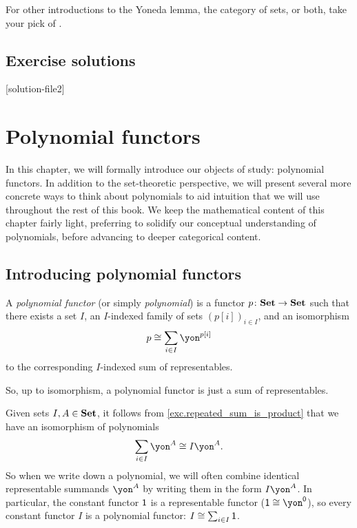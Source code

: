 \documentclass[Book-Poly]{subfiles}
\begin{document}
For other introductions to the Yoneda lemma, the category of sets, or both, take your pick of \cite{Pierce:1991,Borceux:1994a,MacLane:1998a,Leinster:2014a,Riehl:2017a,fong2019seven,cheng_2022}.

\section{Exercise solutions}
{\footnotesize
    }

[solution-file2]










\chapter{Polynomial functors} \label{ch.poly.obj}

In this chapter, we will formally introduce our objects of study: polynomial functors.
In addition to the set-theoretic perspective, we will present several more concrete ways to think about polynomials to aid intuition that we will use throughout the rest of this book.
We keep the mathematical content of this chapter fairly light, preferring to solidify our conceptual understanding of polynomials, before advancing to deeper categorical content.

\section{Introducing polynomial functors} \label{sec.poly.obj.intro}

\begin{definition}
    A \emph{polynomial functor} (or simply \emph{polynomial}) is a functor $p\colon\mathbf{Set}\to\mathbf{Set}$ such that there exists a set $I$, an $I$-indexed family of sets $(p[i])_{i\in I}$, and an isomorphism
    \[
    p\iso\sum_{i\in I}\yon^{p[i]}
    \]
    to the corresponding $I$-indexed sum of representables.
\end{definition}

So, up to isomorphism, a polynomial functor is just a sum of representables.


\begin{remark}
    Given sets $I, A \in \mathbf{Set}$, it follows from \cref{exc.repeated_sum_is_product} that we have an isomorphism of polynomials
    \[
    \sum_{i \in I} \yon^A \iso I\yon^A.
    \]
    So when we write down a polynomial, we will often combine identical representable summands $\yon^A$ by writing them in the form $I\yon^A$.
    In particular, the constant functor $\textsf{1}$ is a representable functor ($\1 \iso \yon^\0$), so every constant functor $I$ is a polynomial functor: $I \cong \sum_{i \in I} \textsf{1}$.
\end{remark}
\end{document}
